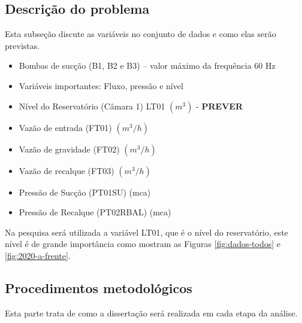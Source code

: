 \subsection{Descri\c c\~ao do problema} \label{subsec:descricao}

Esta subseção discute as variáveis no conjunto de dados e como elas serão previstas.

\begin{itemize}
	\item Bombas de sucção (B1, B2 e B3) – valor máximo da frequência 60 Hz
	
	\item[] Variáveis importantes: Fluxo, pressão e nível
	
	\item Nível do Reservatório (Câmara 1) LT01 $ (m^3) $ - \textbf{PREVER}
	
	\item Vazão de entrada (FT01) $ (m^3/h) $
	
	\item Vazão de gravidade (FT02) $ (m^3/h) $
	
	\item Vazão de recalque (FT03) $ (m^3/h) $
	
	\item Pressão de Sucção (PT01SU) (mca)
	
	\item Pressão de Recalque (PT02RBAL) (mca)
\end{itemize}

Na pesquisa será utilizada a variável LT01, que é o nível do reservatório, este nível é de grande importância como mostram as Figuras \ref{fig:dados-todos} e \ref{fig:2020-a-frente}.

\subsection{Procedimentos metodol{\'o}gicos} \label{subsec:metod}

Esta parte trata de como a dissertação será realizada em cada etapa da análise.
   
